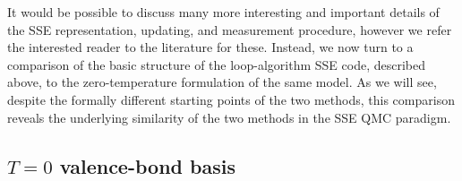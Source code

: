 \documentclass[vecphys]{svmult}
\begin{document}
It would be possible to discuss many more interesting and important details of the SSE representation, updating, and measurement procedure, however we refer the interested reader to the literature for these.  Instead, we now turn to a comparison of the basic structure of the loop-algorithm SSE code, described above, to the zero-temperature formulation of the same model.  As we will see, despite the formally different starting points of the two methods, this comparison reveals the underlying similarity of the two methods in the SSE QMC paradigm.

\subsection{$T=0$ valence-bond basis} \label{Melko:VBB}
\end{document}

